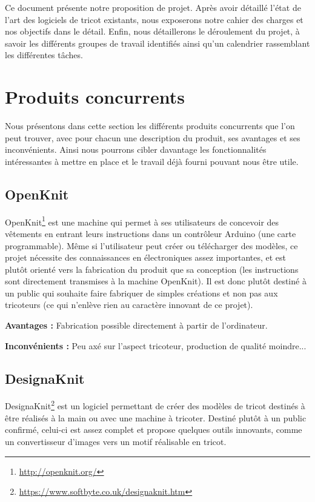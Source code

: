 \documentclass{article}
\begin{document}
Ce document présente notre proposition de projet. Après avoir détaillé l'état de l'art des logiciels de tricot existants, nous exposerons
notre cahier des charges et nos objectifs dans le détail. Enfin, nous détaillerons le déroulement du projet, à savoir les différents
groupes de travail identifiés ainsi qu'un calendrier rassemblant les différentes tâches.



\section{Produits concurrents}

Nous présentons dans cette section les différents produits concurrents que l'on peut trouver, avec pour chacun une description du produit,
ses avantages et ses inconvénients. Ainsi nous pourrons cibler davantage les fonctionnalités intéressantes à mettre en place et le
travail déjà fourni pouvant nous être utile.

\subsection{OpenKnit}

OpenKnit\footnote{\url{http://openknit.org/}} est une machine qui permet à ses utilisateurs de concevoir des vêtements en entrant leurs
instructions dans un contrôleur Arduino (une carte programmable). Même si l'utilisateur peut créer ou télécharger des modèles, ce projet
nécessite des connaissances en électroniques assez importantes, et est plutôt orienté vers la fabrication du produit que sa conception
(les instructions sont directement transmises à la machine OpenKnit). Il est donc plutôt destiné à un public qui souhaite faire fabriquer
de simples créations et non pas aux tricoteurs (ce qui n'enlève rien au caractère innovant de ce projet).

\textbf{Avantages : } Fabrication possible directement à partir de l'ordinateur.

\textbf{Inconvénients : } Peu axé sur l'aspect tricoteur, production de qualité moindre...

\subsection{DesignaKnit}

DesignaKnit\footnote{\url{https://www.softbyte.co.uk/designaknit.htm}} est un logiciel permettant de créer des modèles de tricot destinés
à être réalisés à la main ou avec une machine à tricoter. Destiné plutôt à un public confirmé, celui-ci est assez complet et propose
quelques outils innovants, comme un convertisseur d'images vers un motif réalisable en tricot.
\end{document}
